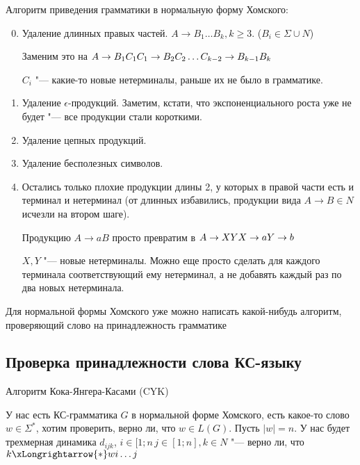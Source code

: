Алгоритм приведения грамматики в нормальную форму Хомского:

\begin{enumerate}
\setcounter{enumi}{-1}
\item
Удаление длинных правых частей.
$A \to B_1 \dots B_k, k \geq 3$. ($B_i \in \Sigma \cup N$) 

Заменим это на $\\
A \to B_1C_1 \\
C_1 \to B_2C_2 \\
\dots \\
C_{k-2} \to B_{k-1}B_k$
                                      
$C_i$ "--- какие-то новые нетерминалы, раньше их не было в грамматике.

\item
Удаление $\epsilon$-продукций. Заметим, кстати, что экспоненциального роста уже не будет "--- все продукции стали короткими.

\item
Удаление цепных продукций.

\item
Удаление бесполезных символов.

\item
Остались только плохие продукции длины 2, у которых в правой части есть и терминал и нетерминал (от длинных избавились, продукции вида $A \to B \in N$ исчезли на втором шаге).

Продукцию $A \to aB$ просто превратим в $\\
A \to XY
X \to a
Y \to b
$

$X, Y$ "--- новые нетерминалы.
Можно еще просто сделать для каждого терминала соответствующий ему нетерминал, а не добавять каждый раз по два новых нетерминала.
\end{enumerate}                        

Для нормальной формы Хомского уже можно написать какой-нибудь алгоритм, проверяющий слово на принадлежность грамматике
\subsection{Проверка принадлежности слова КС-языку}
Алгоритм Кока-Янгера-Касами (CYK)

У нас есть КС-грамматика $G$ в нормальной форме Хомского, есть  какое-то слово $w \in \Sigma^*$, хотим проверить, верно ли, что $w \in L(G)$.
Пусть $|w| = n$. 
У нас будет трехмерная динамика $d_{ijk}$, $i \in [1; n\, j \in [1; n], k \in N$ "--- верно ли, что $k \xLongrightarrow{*} w{i\dots j}$

